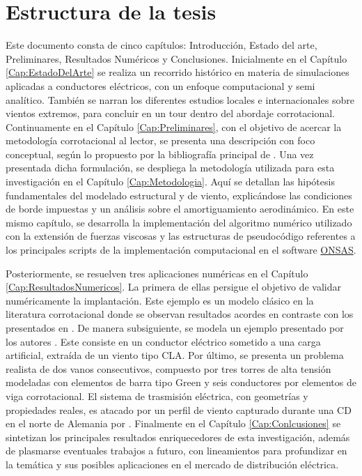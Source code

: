 \section{Estructura de la tesis}

Este documento consta de cinco capítulos: Introducción, Estado del arte, Preliminares, Resultados Numéricos y Conclusiones. Inicialmente en el Capítulo \ref{Cap:EstadoDelArte} se realiza un recorrido histórico en materia de simulaciones aplicadas a conductores eléctricos, con un enfoque computacional y semi analítico. También se narran los diferentes estudios locales e internacionales sobre vientos extremos, para concluir en un tour dentro del abordaje corrotacional. Continuamente en el Capítulo \ref{Cap:Preliminares}, con el objetivo de acercar la metodología corrotacional al lector, se presenta una descripción con foco conceptual, según lo propuesto por la bibliografía principal de \citet{Le2014}. Una vez presentada dicha formulación, se despliega la metodología utilizada para esta investigación en el Capítulo \ref{Cap:Metodologia}. Aquí se detallan las hipótesis fundamentales del modelado estructural y de viento, explicándose las condiciones de borde impuestas y un análisis sobre el amortiguamiento aerodinámico. En este mismo capítulo, se desarrolla la implementación del algoritmo numérico utilizado con la extensión de fuerzas viscosas y las estructuras de pseudocódigo referentes a los principales scripts de la implementación computacional en el software \href{https://github.com/ONSAS/ONSAS/}{ONSAS}. 


Posteriormente, se resuelven tres aplicaciones numéricas en el Capítulo \ref{Cap:ResultadosNumericos}. La primera de ellas persigue el objetivo de validar numéricamente la implantación. Este ejemplo es un modelo clásico en la literatura corrotacional donde se observan resultados acordes en contraste con los presentados en \cite{Le2014}. De manera subsiguiente, se modela un ejemplo presentado por los autores \cite{Foti2016}. Este consiste en un conductor eléctrico sometido a una carga artificial, extraída de un viento tipo \gls{CLA}. Por último, se presenta un problema realista de dos vanos consecutivos, compuesto por tres torres de alta tensión modeladas con elementos de barra tipo Green y seis conductores por elementos de viga corrotacional. El sistema de trasmisión eléctrica, con geometrías y propiedades reales, es atacado por un perfil de viento capturado durante una CD en el norte de Alemania por \cite{stengel2017measurements}. Finalmente en el Capítulo \ref{Cap:Conlcusiones} se sintetizan los principales resultados enriquecedores de esta investigación, además de plasmarse eventuales trabajos a futuro, con lineamientos para profundizar en la temática y sus posibles aplicaciones en el mercado de distribución eléctrica.  

